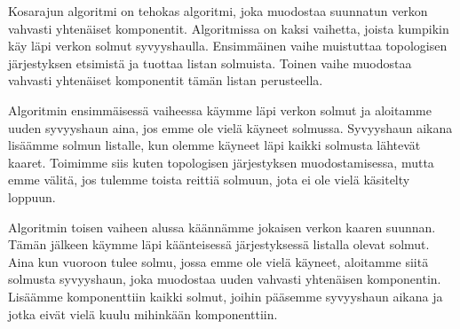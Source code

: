 Kosarajun algoritmi on tehokas algoritmi,
joka muodostaa suunnatun verkon vahvasti yhtenäiset
komponentit. Algoritmissa on kaksi vaihetta,
joista kumpikin käy läpi verkon solmut syvyyshaulla.
Ensimmäinen vaihe muistuttaa topologisen järjestyksen
etsimistä ja tuottaa listan solmuista.
Toinen vaihe muodostaa vahvasti yhtenäiset komponentit
tämän listan perusteella.

Algoritmin ensimmäisessä vaiheessa käymme läpi verkon
solmut ja aloitamme uuden syvyyshaun aina,
jos emme ole vielä käyneet solmussa.
Syvyyshaun aikana lisäämme solmun listalle,
kun olemme käyneet läpi kaikki solmusta lähtevät kaaret.
Toimimme siis kuten topologisen järjestyksen muodostamisessa,
mutta emme välitä, jos tulemme toista reittiä solmuun,
jota ei ole vielä käsitelty loppuun.

Algoritmin toisen vaiheen alussa
käännämme jokaisen verkon kaaren suunnan.
Tämän jälkeen käymme läpi käänteisessä järjestyksessä
listalla olevat solmut.
Aina kun vuoroon tulee solmu, jossa emme ole vielä käyneet,
aloitamme siitä solmusta syvyyshaun,
joka muodostaa uuden vahvasti yhtenäisen komponentin.
Lisäämme komponenttiin kaikki solmut,
joihin pääsemme syvyyshaun aikana ja jotka eivät
vielä kuulu mihinkään komponenttiin.

